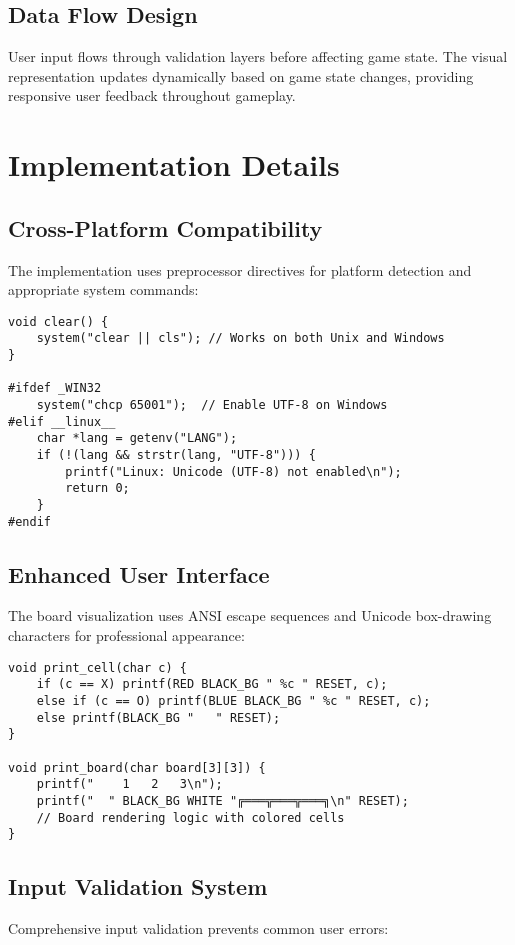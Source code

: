 \documentclass[12pt]{article}
\begin{document}
\subsection{Data Flow Design}
User input flows through validation layers before affecting game state. The visual representation updates dynamically based on game state changes, providing responsive user feedback throughout gameplay.

\section{Implementation Details}

\subsection{Cross-Platform Compatibility}
The implementation uses preprocessor directives for platform detection and appropriate system commands:

\begin{lstlisting}[caption=Cross-Platform Console Management]
void clear() {
    system("clear || cls"); // Works on both Unix and Windows
}

#ifdef _WIN32
    system("chcp 65001");  // Enable UTF-8 on Windows
#elif __linux__
    char *lang = getenv("LANG");
    if (!(lang && strstr(lang, "UTF-8"))) {
        printf("Linux: Unicode (UTF-8) not enabled\n");
        return 0;
    }
#endif
\end{lstlisting}

\subsection{Enhanced User Interface}
The board visualization uses ANSI escape sequences and Unicode box-drawing characters for professional appearance:

\begin{lstlisting}[caption=Board Rendering with ANSI Colors]
void print_cell(char c) {
    if (c == X) printf(RED BLACK_BG " %c " RESET, c);
    else if (c == O) printf(BLUE BLACK_BG " %c " RESET, c);
    else printf(BLACK_BG "   " RESET);
}

void print_board(char board[3][3]) {
    printf("    1   2   3\n");
    printf("  " BLACK_BG WHITE "╔═══╦═══╦═══╗\n" RESET);
    // Board rendering logic with colored cells
}
\end{lstlisting}

\subsection{Input Validation System}
Comprehensive input validation prevents common user errors:
\end{document}
